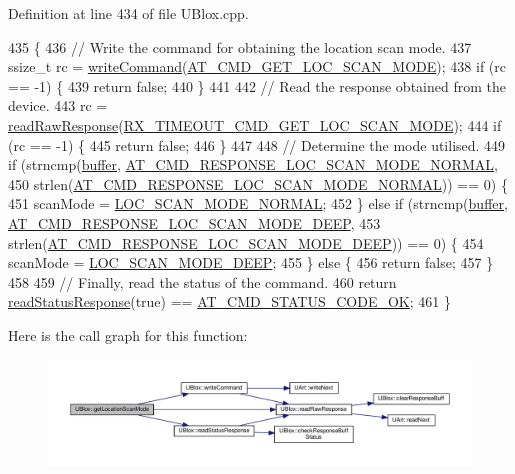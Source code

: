 Definition at line 434 of file U\+Blox.\+cpp.


\begin{DoxyCode}
435 \{
436     \textcolor{comment}{// Write the command for obtaining the location scan mode.}
437     ssize\_t rc = \hyperlink{class_u_blox_af604d1897a66192bf1c2a11997f2634d}{writeCommand}(\hyperlink{_u_blox_8cpp_aa504e436aeb04e6bfb7c361cf9edbd84}{AT\_CMD\_GET\_LOC\_SCAN\_MODE});
438     \textcolor{keywordflow}{if} (rc == -1) \{
439         \textcolor{keywordflow}{return} \textcolor{keyword}{false};
440     \}
441 
442     \textcolor{comment}{// Read the response obtained from the device.}
443     rc = \hyperlink{class_u_blox_ab4a7ab4b8922d91e23f273ae160c1bed}{readRawResponse}(\hyperlink{_u_blox_8cpp_a0b1a22aab74a699289cd3d58b177fd21}{RX\_TIMEOUT\_CMD\_GET\_LOC\_SCAN\_MODE});
444     \textcolor{keywordflow}{if} (rc == -1) \{
445         \textcolor{keywordflow}{return} \textcolor{keyword}{false};
446     \}
447 
448     \textcolor{comment}{// Determine the mode utilised.}
449     \textcolor{keywordflow}{if} (strncmp(\hyperlink{class_u_blox_a6ca4b90f3dc4e856181dce1ebda6f82c}{buffer}, \hyperlink{_u_blox_8cpp_a2e9e8dc94d8cbe1833df3d521e4b08e9}{AT\_CMD\_RESPONSE\_LOC\_SCAN\_MODE\_NORMAL},
450                 strlen(\hyperlink{_u_blox_8cpp_a2e9e8dc94d8cbe1833df3d521e4b08e9}{AT\_CMD\_RESPONSE\_LOC\_SCAN\_MODE\_NORMAL})) == 0) \{
451         scanMode = \hyperlink{_u_blox_8h_a57e74368f6c6813ceb64f972eba4a5f3}{LOC\_SCAN\_MODE\_NORMAL};
452     \} \textcolor{keywordflow}{else} \textcolor{keywordflow}{if} (strncmp(\hyperlink{class_u_blox_a6ca4b90f3dc4e856181dce1ebda6f82c}{buffer}, \hyperlink{_u_blox_8cpp_a5e536a389492c1923382728d0e6c6931}{AT\_CMD\_RESPONSE\_LOC\_SCAN\_MODE\_DEEP},
453                        strlen(\hyperlink{_u_blox_8cpp_a5e536a389492c1923382728d0e6c6931}{AT\_CMD\_RESPONSE\_LOC\_SCAN\_MODE\_DEEP})) == 0) 
      \{
454         scanMode = \hyperlink{_u_blox_8h_a5c819e4d40995d2854dc0e2cddd7ddef}{LOC\_SCAN\_MODE\_DEEP};
455     \} \textcolor{keywordflow}{else} \{
456         \textcolor{keywordflow}{return} \textcolor{keyword}{false};
457     \}
458 
459     \textcolor{comment}{// Finally, read the status of the command.}
460     \textcolor{keywordflow}{return} \hyperlink{class_u_blox_a4eaca5b1b1c4b5b6f6164b220dd43e0b}{readStatusResponse}(\textcolor{keyword}{true}) == \hyperlink{_u_blox_8cpp_a6ebc1682eb6b9964fccb4a61688ff307}{AT\_CMD\_STATUS\_CODE\_OK};
461 \}
\end{DoxyCode}
Here is the call graph for this function\+:\nopagebreak
\begin{figure}[H]
\begin{center}
\leavevmode
\includegraphics[width=350pt]{da/df6/class_u_blox_a398db4cdc2d5356fb86b3cd1021bad1b_cgraph}
\end{center}
\end{figure}
